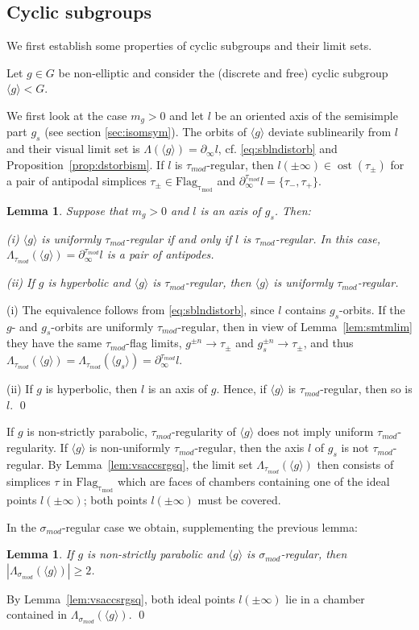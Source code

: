 \documentclass[12pt]{article}
\theoremstyle{boldplain}
\newtheorem{lem}[equation]{Lemma}
\theoremstyle{bolddefinition}
\numberwithin{equation}{section}
\def\La{\Lambda}
\def\si{\sigma}
\def\Flagt{\operatorname{Flag_{\tau_{mod}}}}
\def\geo{\partial_{\infty}}
\def\geot{\partial_{\infty}^{\tau_{mod}}}
\def\Las{\Lambda_{\sigma_{mod}}}
\def\Lat{\La_{\tau_{mod}}}
\def\simod{\si_{mod}}
\def\ost{\operatorname{ost}}
\def\taumod{\tau_{mod}}
\def\<{\langle}
\def\>{\rangle}
\begin{document}
\subsection{Cyclic subgroups}
\label{sec:cyc}

We first establish some properties  of cyclic subgroups and their limit sets. 

Let $g\in G$ be non-elliptic and consider the (discrete and free) cyclic subgroup $\<g\><G$.

We first look at the case $m_g>0$  
and let $l$ be an oriented axis of the semisimple part $g_s$  (see section \ref{sec:isomsym}).
The orbits of $\<g\>$ deviate sublinearily from $l$ and their visual limit set is 
$\La(\<g\>)=\geo l$,
cf. \eqref{eq:sblndistorb} and Proposition~\ref{prop:dstorbism}.
If $l$ is $\taumod$-regular,
then $l(\pm\infty)\in\ost(\tau_\pm)$
for a pair of antipodal simplices $\tau_{\pm}\in\Flagt$ 
and $\geot l=\{\tau_-, \tau_+\}$. 

\begin{lem}
\label{lem:cclsbgmgp}
Suppose that $m_g>0$ and $l$ is an axis of $g_s$.
Then:

(i) $\<g\>$ is uniformly $\taumod$-regular if and only if $l$ is $\taumod$-regular.
In this case, 
$\Lat(\<g\>)=\geot l$ is a pair of antipodes.

(ii) If $g$ is hyperbolic and $\<g\>$ is $\taumod$-regular, then $\<g\>$ is uniformly $\taumod$-regular.
\end{lem}

\proof
(i) 
The equivalence follows from \eqref{eq:sblndistorb}, since $l$ contains $g_s$-orbits. 
If the $g$- and $g_s$-orbits are uniformly $\taumod$-regular,
then in view of Lemma~\ref{lem:smtmlim}
they have the same $\taumod$-flag limits, 
$g^{\pm n}\to\tau_{\pm}$ and $g_s^{\pm n}\to\tau_{\pm}$,
and thus $\Lat(\<g\>)=\Lat(\<g_s\>)=\geot l$.

(ii)
If $g$ is hyperbolic, then 
$l$ is an axis of $g$.
Hence, if $\<g\>$ is $\taumod$-regular, then so is $l$.
\qed

\medskip 
If $g$ is non-strictly parabolic,
$\taumod$-regularity of $\<g\>$ does not imply uniform $\taumod$-regularity.
If $\<g\>$ is non-uniformly $\taumod$-regular,
then the axis $l$ of $g_s$ is not $\taumod$-regular.
By Lemma~\ref{lem:vsaccsrgsq},
the limit set $\Lat(\<g\>)$ then consists of simplices $\tau$ in $\Flagt$
which are faces of chambers containing one of the ideal points $l(\pm\infty)$;
both points $l(\pm\infty)$ must be covered.

In the $\simod$-regular case we obtain, supplementing the previous lemma:
\begin{lem}
\label{lem:lstptrn}
If $g$ is non-strictly parabolic and $\<g\>$ is $\simod$-regular, then $|\Las(\<g\>)|\geq2$. 
\end{lem}
\proof 
By Lemma~\ref{lem:vsaccsrgsq}, 
both ideal points $l(\pm\infty)$ lie in a chamber contained in $\Las(\<g\>)$.
\qed
\end{document}
